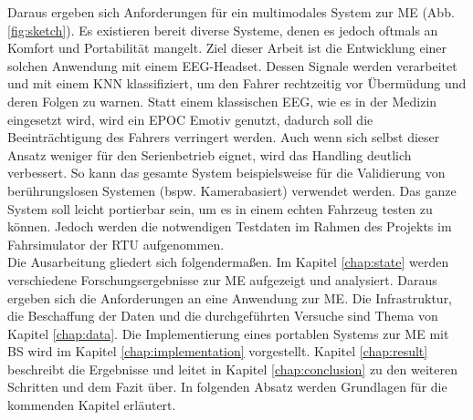 Daraus ergeben sich Anforderungen für ein multimodales System zur \acl{ME}  (Abb. \ref{fig:sketch}). Es existieren bereit diverse Systeme, denen es jedoch oftmals an Komfort und Portabilität mangelt. Ziel dieser Arbeit ist die Entwicklung einer solchen Anwendung mit einem EEG-Headset. 
Dessen Signale werden verarbeitet und mit einem KNN klassifiziert, um den Fahrer rechtzeitig vor Übermüdung und deren Folgen zu warnen.
Statt einem klassischen EEG, wie es in der Medizin eingesetzt wird, wird ein EPOC Emotiv genutzt, dadurch soll die Beeinträchtigung des Fahrers verringert werden. Auch wenn sich selbst dieser Ansatz weniger für den Serienbetrieb eignet, wird das Handling deutlich verbessert. So kann das gesamte System beispielsweise für die Validierung von berührungslosen Systemen (bspw. Kamerabasiert) verwendet werden. Das ganze System soll leicht portierbar sein, um es in einem echten Fahrzeug testen zu können. Jedoch werden die notwendigen Testdaten im Rahmen des Projekts im Fahrsimulator der \acl{RTU} aufgenommen.
\\ 

Die Ausarbeitung gliedert sich folgendermaßen. Im Kapitel \ref{chap:state} werden verschiedene Forschungsergebnisse zur \acl{ME} aufgezeigt und analysiert. Daraus ergeben sich die Anforderungen an eine Anwendung zur \acl{ME}. Die Infrastruktur, die Beschaffung der Daten und die durchgeführten Versuche sind Thema von Kapitel \ref{chap:data}. Die Implementierung eines portablen Systems zur \acl{ME} mit \acl{BS} wird im Kapitel \ref{chap:implementation} vorgestellt. Kapitel \ref{chap:result} beschreibt die Ergebnisse und leitet in Kapitel \ref{chap:conclusion} zu den weiteren Schritten und dem Fazit über. In folgenden Absatz werden Grundlagen für die kommenden Kapitel erläutert.